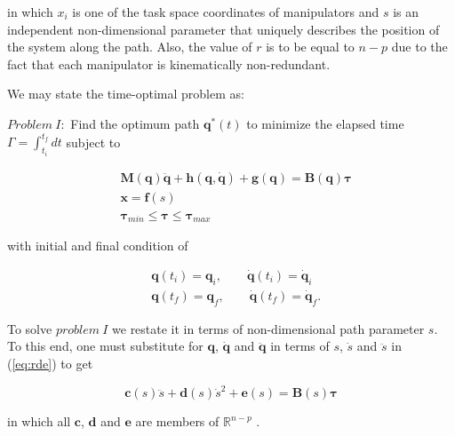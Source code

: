 \documentclass{rob}%
\begin{document}
\noindent
in which $ x_i $ is one of the task space coordinates of manipulators and $ s $ is an independent non-dimensional parameter that uniquely describes the position of the system along the path. Also, the value of $ r $ is to be equal to $ n-p $ due to the fact that each manipulator is kinematically non-redundant.

We may state the time-optimal problem as:\medskip

$ Problem \ I: $ Find the optimum path $ \boldsymbol{q}^*(t) $ to minimize the elapsed time $ \Gamma=\int_{t_{i}}^{t_{f}} dt $ subject to

\begin{equation}
\label{eq:P1}
\begin{aligned}
&{\mathbf{M}}(\boldsymbol q)\ddot{\boldsymbol q}+{\boldsymbol h}(\boldsymbol q,\dot{\boldsymbol q})+{\boldsymbol g}(\boldsymbol q)={\mathbf{B}}(\boldsymbol q) \boldsymbol{\tau}\\
&\boldsymbol x=\boldsymbol f(s)\\
&\boldsymbol \tau_{min}\leq \boldsymbol \tau \leq  \boldsymbol \tau_{max}
\end{aligned}
\end{equation}

\noindent
with initial and final condition of

\begin{equation}
\begin{aligned}
&\boldsymbol q(t_i)=\boldsymbol  q_i,\qquad \dot{\boldsymbol{q}}(t_i)=\dot{\boldsymbol{q}}_i\\
&\boldsymbol q(t_f)=\boldsymbol  q_f,\qquad \dot{\boldsymbol{q}}(t_f)=\dot{\boldsymbol{q}}_f.\nonumber
\end{aligned}
\end{equation}

To solve $ problem \ I $ we restate it in terms of non-dimensional path parameter $ s $. To this end, one must substitute for $ \boldsymbol q $, $ \dot{\boldsymbol q} $ and $ \ddot{\boldsymbol q} $ in terms of $ s $, $ \dot{s} $ and $ \ddot{s} $ in (\ref{eq:rde}) to get

\begin{equation}
\label{eq:bar}
{\boldsymbol c}(s)\ddot s+{\boldsymbol d}(s)\dot s^2+{\boldsymbol e}(s)={\mathbf B}(s)\boldsymbol \tau
\end{equation}

\noindent
in which all $ {\boldsymbol c} $, $ {\boldsymbol d} $ and $ {\boldsymbol e} $ are members of $ \mathbb{R}^{n-p}$ \cite{Ghasemi2008}. 
\end{document}
